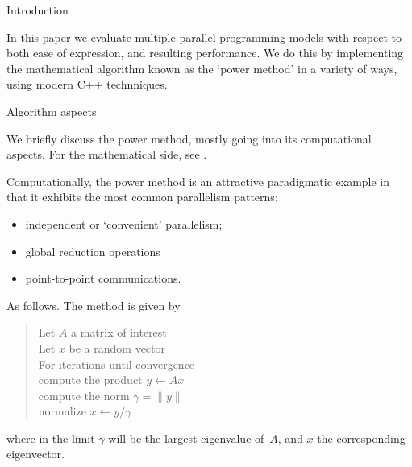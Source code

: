 
 {Introduction}

In this paper we evaluate multiple parallel programming models
with respect to both ease of expression, and resulting performance.
We do this by implementing the mathematical algorithm
known as the `power method' in a variety of ways,
using modern C++ technniques.

 {Algorithm aspects}


We briefly discuss the power method, mostly going into
its computational aspects.
For the mathematical side, see .

Computationally, the power method is an attractive paradigmatic example
in that it exhibits the most common parallelism patterns:
\begin{itemize}
\item independent or `convenient' parallelism;
\item global reduction operations
\item point-to-point communications.
\end{itemize}
As follows.
The method is given by
\begin{quote}
  \begin{tabbing}
    Let $A$ a matrix of interest\\
    Let $x$ be a random vector\\
    For \=iterations until convergence\\
    \> compute the product $y\leftarrow Ax$\\
    \> compute the norm $\gamma=\| y \|$\\
    \> normalize $x\leftarrow y/\gamma$\\
  \end{tabbing}
\end{quote}
where in the limit $\gamma$ will be the
largest eigenvalue of~$A$,
and $x$ the corresponding eigenvector.

